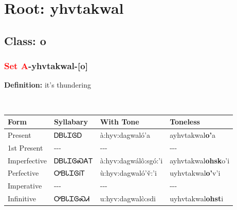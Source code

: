 \needspace{4in}
\section*{Root: yhvtakwal}
\nopagebreak
{}
\needspace{3in}
\subsection*{Class: o}
\nopagebreak
\needspace{2in}
\subsubsection*{\textcolor{Red}{Set A}{-}\textbf{yhvtakwal}{-}[o]}
\nopagebreak
\textbf{Definition: } it{\textquoteright}s thundering
\\[0.5em]
\begin{tabularx}{\textwidth}{l X X X}%
\toprule%
\textbf{Form}&\textbf{Syllabary}&\textbf{With Tone}&\textbf{Toneless}\\%
\midrule%
Present&ᎠᏴᏓᏆᎶᎠ&à:hyv:dagwaló’a&ayhvtakwal\textbf{o'}a\\%
1st Present&{-}{-}{-}&{-}{-}{-}&{-}{-}{-}\\%
Imperfective&ᎠᏴᏓᏆᎶᏍᎪᎢ&à:hyv:dagwálô:sgó:’i&ayhvtakwal\textbf{ohsk}o'i\\%
Perfective&ᎤᏴᏓᏆᎶᎥᎢ&ù:hyv:dagwaló’v̌:’i&uyhvtakwal\textbf{o'}v'i\\%
Imperative&{-}{-}{-}&{-}{-}{-}&{-}{-}{-}\\%
Infinitive&ᎤᏴᏓᏆᎶᏍᏗ&u:hyv:dagwalò:sdi&uyhvtakwal\textbf{ohst}i\\%
\bottomrule%
\end{tabularx}
\\[1em]